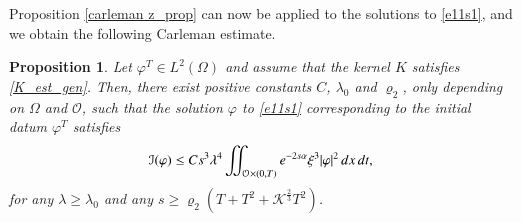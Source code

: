 \documentclass[preprint,1p]{elsarticle}
\newcommand{\intd}{\displaystyle\int \kern -7pt \int}
\newtheorem{proposition}{\bf Proposition}[section]
\begin{document}
Proposition \ref{carleman z_prop} can now be applied to the solutions to \eqref{e11s1}, and we obtain the following Carleman estimate.

\begin{proposition}\label{carleman_phi_prop} 
Let $\varphi^T\in L^2(\Omega)$ and assume that the kernel $K$ satisfies \eqref{K_est_gen}. Then, there exist positive constants $C$, $\lambda_0$ and $\varrho_2$, only depending on $\Omega$ and $\mathcal O$, such that the solution $\varphi$ to \eqref{e11s1} corresponding to the initial datum $\varphi^T$ satisfies  
\begin{align}\label{e5s2}
	\mathcal{I}(\varphi) \leq C s^3\lambda^4\intd_{\mathcal O\times(0,T)} e^{-2s\alpha}\xi^3 |\varphi|^2\,dx\,dt, 
\end{align}
for any $\lambda\geq \lambda_0$ and any $s\geq \varrho_2\left(T + T^2 + \mathcal{K}^{\frac 23}T^2\right)$.
\end{proposition}
%
\end{document}
